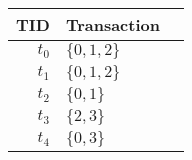 \begin{tabular}{|r|l|l|}
  \hline
  TID   & Transaction \\ \hline
  $t_0$ & $\{0,1,2\}$       \\
  $t_1$ & $\{0,1,2\}$       \\
  $t_2$ & $\{0,1\}$         \\
  $t_3$ & $\{2,3\}$       \\
  $t_4$ & $\{0,3\}$       \\\hline
\end{tabular}
